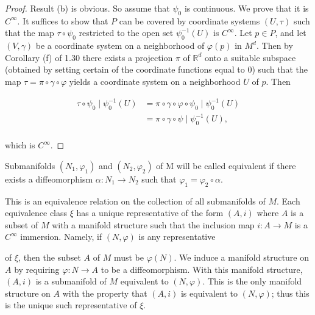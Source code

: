 \begin{proof}
	Result (b) is obvious. So assume that $\psi_0$ is continuous. We prove that it is $C^\infty$. It suffices to show that $P$ can be covered by coordinate systems $(U,\tau)$ such that the map $\tau\circ\psi_0$ restricted to the open set $\psi_0^{-1}(U)$ is $C^\infty$. Let $p\in P$, and let $(V,\gamma)$ be a coordinate system on a neighborhood of $\varphi(p)$ in $M^d$. Then by Corollary (f) of 1.30 there exists a projection $\pi$ of $\mathbb{R}^d$ onto a suitable subspace (obtained by setting certain of the coordinate functions equal to $0$) such that the map $\tau=\pi\circ\gamma\circ\varphi$ yields a coordinate system on a neighborhood $U$ of $p$. Then

	\[
		\begin{aligned}{\tau\circ\psi_{0}\mid\psi_{0}^{-1}(U)}&{{}=\pi\circ\gamma\circ\varphi\circ\psi_{0}\mid\psi_{0}^{-1}(U)}\\ {}&{{}=\pi\circ\gamma\circ\psi\mid\psi_{0}^{-1}(U),}\\ \end{aligned}
	\]

	which is $C^{\infty}$.

\end{proof}

\label{thm:1.33}
Submanifolds  $ (N_{1},\varphi_{1}) $ and  $ (N_{2},\varphi_{2}) $ of M will be called equivalent if there exists a diffeomorphism  $ \alpha\colon N_{1}\to N_{2} $ such that  $ \varphi_{1}=\varphi_{2}\circ\alpha $. 

\begin{center}
\end{center}

This is an equivalence relation on the collection of all submanifolds of $M$. Each equivalence class $\xi$ has a unique representative of the form $(A,i)$ where $A$ is a subset of $M$ with a manifold structure such that the inclusion map $i: A \to M$ is a $C^\infty$ immersion. Namely, if $(N,\varphi)$ is any representative

of $\xi$, then the subset $A$ of $M$ must be $\varphi(N)$. We induce a manifold structure on $A$ by requiring $\varphi: N \to A$ to be a diffeomorphism. With this manifold structure, $(A,i)$ is a submanifold of $M$ equivalent to $(N,\varphi)$. This is the only manifold structure on $A$ with the property that $(A,i)$ is equivalent to $(N,\varphi)$; thus this is the unique such representative of $\xi$.

